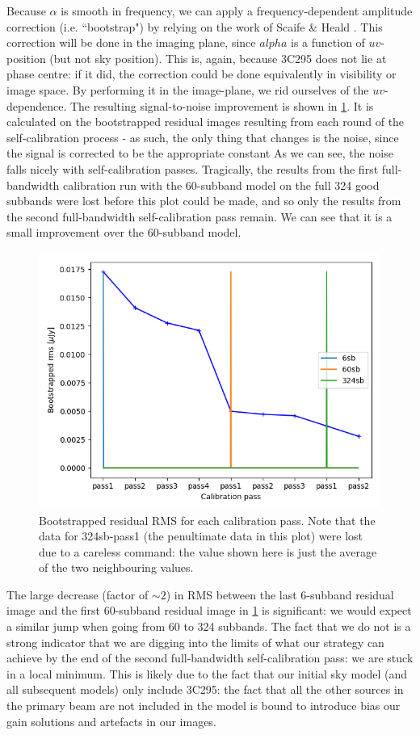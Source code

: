 \pg
Because $\alpha$ is smooth in frequency, we can apply a frequency-dependent amplitude correction (i.e. ``bootstrap") by relying on the work of Scaife \& Heald \citep[see][]{arse}. This correction will be done in the imaging plane, since $alpha$ is a function of $uv$-position (but not sky position). This is, again, because 3C295 does not lie at phase centre: if it did, the correction could be done equivalently in visibility or image space. By performing it in the image-plane, we rid ourselves of the $uv$-dependence. The resulting signal-to-noise improvement is shown in \cref{fig.SCrms}. It is calculated on the bootstrapped residual images resulting from each round of the self-calibration process - as such, the only thing that changes is the noise, since the signal is corrected to be the appropriate constant As we can see, the noise falls nicely with self-calibration passes. Tragically, the results from the first full-bandwidth calibration run with the 60-subband model on the full 324 good subbands were lost before this plot could be made, and so only the results from the second full-bandwidth self-calibration pass remain. We can see that it is a small improvement over the 60-subband model. 
\begin{figure}[h!]
\includegraphics[width=0.8\linewidth]{images/SCrms.png}
\caption{\label{fig.SCrms} Bootstrapped residual RMS for each calibration pass. Note that the data for 324sb-pass1 (the penultimate data in this plot) were lost due to a careless command: the value shown here is just the average of the two neighbouring values.}
\end{figure}

\pg
The large decrease (factor of $\sim2$) in RMS between the last 6-subband residual image and the first 60-subband residual image in \cref{fig.SCrms} is significant: we would expect a similar jump when going from 60 to 324 subbands. The fact that we do not is a strong indicator that we are digging into the limits of what our strategy can achieve by the end of the second full-bandwidth self-calibration pass: we are stuck in a local minimum. This is likely due to the fact that our initial sky model (and all subsequent models) only include 3C295: the fact that all the other sources in the primary beam are not included in the model is bound to introduce bias our gain solutions and artefacts in our images. 

